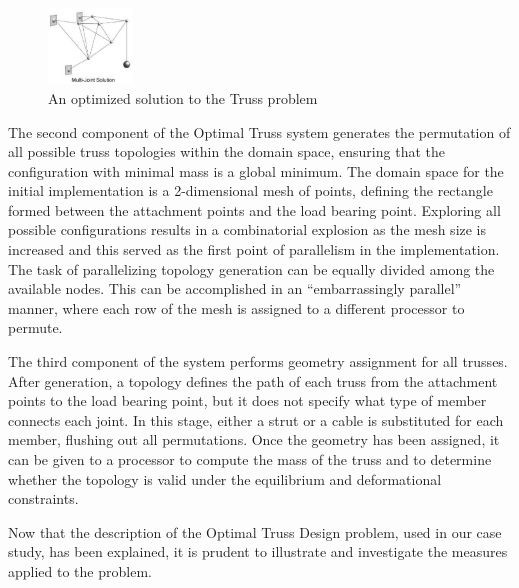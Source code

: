 \documentclass[10pt,twocolumn]{article}
\begin{document}
\begin{figure}[htpb]
  \centering
  \includegraphics[width=0.2\textwidth]{multijoint.truss.eps}
  \caption{An optimized solution to the Truss problem}
  \label{fig:multijoint_truss}
\end{figure}

The second component of the Optimal Truss system generates the permutation
of all possible truss topologies within the domain space, ensuring that the
configuration with minimal mass is a global minimum.  The domain space for
the initial implementation is a 2-dimensional mesh of points, defining the
rectangle formed between the attachment points and the load bearing point.
Exploring all possible configurations results in a combinatorial explosion
as the mesh size is increased and this served as the first point of
parallelism in the implementation.  The task of parallelizing topology
generation can be equally divided among the available nodes.  This can be
accomplished in an ``embarrassingly parallel'' manner, where each row of
the mesh is assigned to a different processor to permute.

The third component of the system performs geometry assignment for all
trusses.  After generation, a topology defines the path of each truss from
the attachment points to the load bearing point, but it does not specify
what type of member connects each joint.  In this stage, either a strut or
a cable is substituted for each member, flushing out all permutations.
Once the geometry has been assigned, it can be given to a processor to
compute the mass of the truss and to determine whether the topology is
valid under the equilibrium and deformational constraints.

Now that the description of the Optimal Truss Design problem, used in our case study, has been explained, it is prudent to illustrate and investigate the measures applied to the problem.

\label{sec:activetime}
\end{document}
